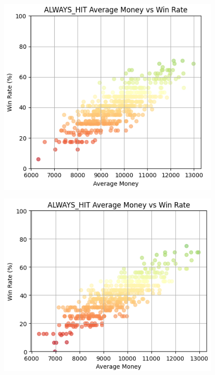 \documentclass[a4paper,12pt]{report}
\begin{document}
\begin{figure}
    \begin{minipage}{0.45\textwidth}
        \centering
        \includegraphics[scale=0.4]{figures/graphs/16.png}
        \label{fig:16}
    \end{minipage}
    \begin{minipage}{0.45\textwidth}
        \includegraphics[scale=0.43]{figures/graphs/17.png}
        \label{fig:17}
    \end{minipage}
    \label{fig:16_17}
\end{figure}
\end{document}
